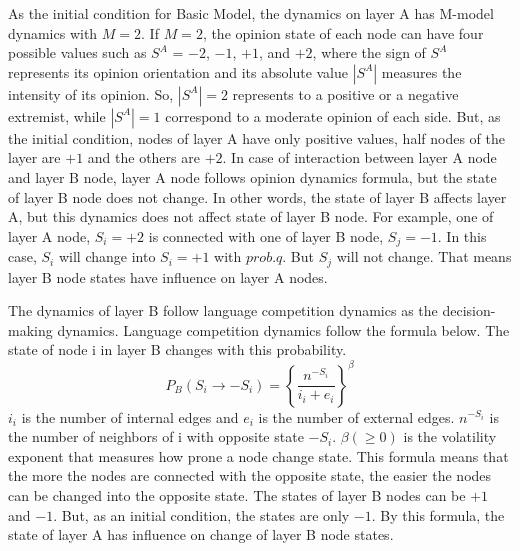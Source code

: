 \documentclass[english]{cccconf}
\begin{document}
As the initial condition for Basic Model, the dynamics on layer A has M-model dynamics with $M = 2$. If $M = 2$, the opinion state of each node can have four possible values such as $S^A$ = $-2$, $-1$, $+1$, and $+2$, where the sign of $S^A$ represents its opinion orientation and its absolute value $|S^A|$ measures the intensity of its opinion. So, $|S^A|=2$ represents to a positive or a negative extremist, while  $|S^A|=1$ correspond to a moderate opinion of each side. But, as the initial condition, nodes of layer A have only positive values, half nodes of the layer are $+1$ and the others are $+2$. In case of interaction between layer A node and layer B node, layer A node follows opinion dynamics formula, but the state of layer B node does not change. In other words, the state of layer B affects layer A, but this dynamics does not affect state of layer B node. For example, one of layer A node, $S_i = +2$ is connected with one of layer B node, $S_j = -1$. In this case, $S_i$ will change into $S_i = +1$ with $prob.q$. But $S_j$ will not change. That means layer B node states have influence on layer A nodes.

The dynamics of layer B follow language competition dynamics as the decision-making dynamics\cite{abrams2003, vazquez2010}. Language competition dynamics follow the formula below. The state of node i in layer B changes with this probability.
\begin{equation}
P_B(S_i \rightarrow -S_i)= \left \{\frac{n^{-S_i}}{i_i + e_i}\right \}^\beta
\end{equation}
$i_i$ is the number of internal edges and $e_i$ is the number of external edges. $n^{-S_i}$ is the number of neighbors of i with opposite state $-S_i$. $\beta(\geq 0)$ is the volatility exponent that measures how prone a node change state. This formula means that the more the nodes are connected with the opposite state, the easier the nodes can be changed into the opposite state.
The states of layer B nodes can be $+1$ and $-1$. But, as an initial condition, the states are only $-1$. By this formula, the state of layer A has influence on change of layer B node states.
\end{document}
